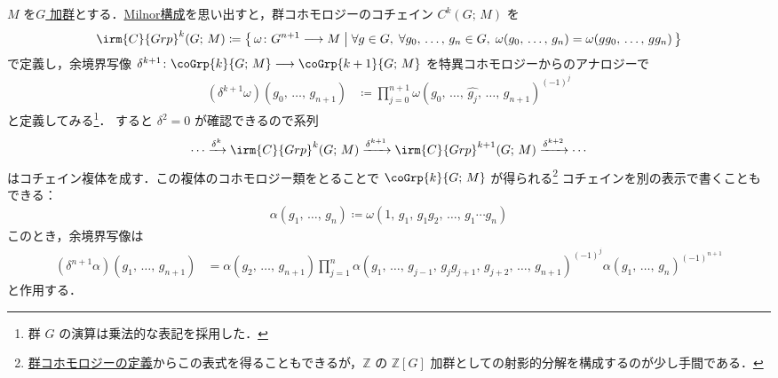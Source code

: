 \documentclass[TQFT_main]{subfiles}
\begin{document}
$M$ を\hyperref[ax:G-mod]{$G$ 加群}とする．\hyperref[]{Milnor構成}を思い出すと，群コホモロジーのコチェイン $C^k (G;\, M)$ を
\begin{align}
    \irm{C}{Grp}^k (G;\, M) \coloneqq \bigl\{\, \omega \colon G^{n+1} \lto M\bigm| \forall g \in G,\; \forall g_0,\, \dots,\, g_n \in G,\; \omega(g_0,\, \dots,\, g_n) = \omega(gg_0,\, \dots,\, gg_n) \,\bigr\} 
\end{align}
で定義し，余境界写像 $\delta^{k+1} \colon \coGrp{k}{G;\, M} \lto \coGrp{k+1}{G;\, M}$ を特異コホモロジーからのアナロジーで
\begin{align}
    (\delta^{k+1} \omega)(g_0,\, \dots,\, g_{n+1})
    &\coloneqq \prod_{j=0}^{n+1} \omega(g_0,\, \dots,\, \widehat{g_j},\, \dots ,\, g_{n+1})^{(-1)^j}
\end{align}
と定義してみる\footnote{群 $G$ の演算は乗法的な表記を採用した．}．
すると $\delta^2 = 0$ が確認できるので系列
\begin{align}
    \cdots \xrightarrow{\delta^k} \irm{C}{Grp}^k (G;\, M) \xrightarrow{\delta^{k+1}} \irm{C}{Grp}^{k+1} (G;\, M) \xrightarrow{\delta^{k+2}} \cdots
\end{align}
はコチェイン複体を成す．この複体のコホモロジー類をとることで $\coGrp{k}{G;\, M}$ が得られる\footnote{\hyperref[def:group-cohomology]{群コホモロジーの定義}からこの表式を得ることもできるが，$\mathbb{Z}$ の $\mathbb{Z}[G]$ 加群としての射影的分解を構成するのが少し手間である．}
コチェインを別の表示で書くこともできる：
\begin{align}
    \alpha(g_1,\, \dots,\, g_n) \coloneqq \omega(1,\, g_1,\, g_1g_2,\, \dots,\, g_1 \cdots g_n)
\end{align}
このとき，余境界写像は
\begin{align}
    (\delta^{n+1} \alpha)(g_1,\, \dots,\, g_{n+1})
    &= \alpha(g_2,\, \dots,\, g_{n+1}) \prod_{j=1}^n \alpha(g_1,\, \dots,\, g_{j-1},\, g_j g_{j+1},\, g_{j+2},\, \dots,\, g_{n+1})^{(-1)^j} \alpha(g_1,\, \dots,\, g_n)^{(-1)^{n+1}}
\end{align}
と作用する．
\end{document}
